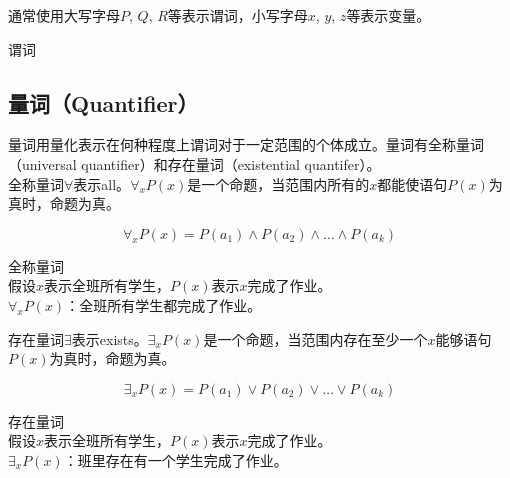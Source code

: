 \documentclass[12pt, openany, oneside]{book}
\begin{document}
通常使用大写字母$ P $, $ Q $, $ R $等表示谓词，小写字母$ x $, $ y $, $ z $等表示变量。

\begin{tcolorbox}
	谓词
	\begin{table}[H]
		\centering
	\end{table}
\end{tcolorbox}

\vspace{0.5cm}

\subsection{量词（Quantifier）}

量词用量化表示在何种程度上谓词对于一定范围的个体成立。量词有全称量词（universal quantifier）和存在量词（existential quantifer）。\\

全称量词$ \forall $表示all。$ \forall_x P(x) $是一个命题，当范围内所有的$ x $都能使语句$ P(x) $为真时，命题为真。

\vspace{-0.5cm}

$$
	\forall_x P(x) = P(a_1) \wedge P(a_2) \wedge \dots \wedge P(a_k)
$$

\begin{tcolorbox}
	全称量词\\
	假设$ x $表示全班所有学生，$ P(x) $表示$ x $完成了作业。\\
	$ \forall_x P(x) $：全班所有学生都完成了作业。
\end{tcolorbox}

存在量词$ \exists $表示exists。$ \exists_x P(x) $是一个命题，当范围内存在至少一个$ x $能够语句$ P(x) $为真时，命题为真。

\vspace{-0.5cm}

$$
	\exists_x P(x) = P(a_1) \vee P(a_2) \vee \dots \vee P(a_k)
$$

\begin{tcolorbox}
	存在量词\\
	假设$ x $表示全班所有学生，$ P(x) $表示$ x $完成了作业。\\
	$ \exists_x P(x) $：班里存在有一个学生完成了作业。
\end{tcolorbox}
\end{document}
